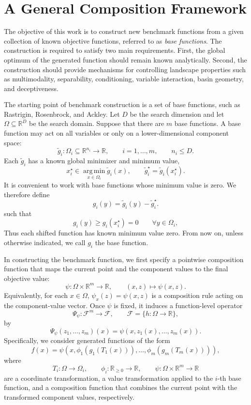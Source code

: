 \documentclass[11pt,a4paper]{article}
\theoremstyle{remark}
\theoremstyle{plain}
\begin{document}
\section{A General Composition Framework}
\label{sec:general-composition}

The objective of this work is to construct new benchmark functions from a
given collection of known objective functions, referred to as
\emph{base functions}. The construction is required to satisfy two main
requirements. First, the global optimum of the generated function should remain
known analytically. Second, the construction should provide mechanisms for
controlling landscape properties such as multimodality, separability,
conditioning, variable interaction, basin geometry, and deceptiveness.

The starting point of benchmark construction is a set of base functions, such
as Rastrigin, Rosenbrock, and Ackley. Let \(D\) be the search dimension and let
\(\Omega\subseteq\mathbb{R}^D\) be the search domain. Suppose that there are
\(m\) base functions. A base function may act on all variables or only on a
lower-dimensional component space:
\[
\tilde g_i:\Omega_i\subseteq\mathbb{R}^{n_i}\to\mathbb{R},
\qquad i=1,\ldots,m,
\qquad n_i\le D.
\]
Each \(\tilde g_i\) has a known global minimizer and minimum value,
\[
x_i^\star\in\operatorname*{arg\,min}_{x\in\Omega_i}\tilde g_i(x),\qquad 
\tilde g_i^\star
=
\tilde g_i(x_i^\star).
\]
It is convenient to work with base functions whose minimum value is zero. We
therefore define
\[
g_i(y)
=
\tilde g_i(y)-\tilde g_i^\star.
\label{eq:bias-corrected-base}
\]
such that
\[
g_i(y)\ge g_i(x_i^\star) =0
\qquad\forall y\in\Omega_i,
\]
Thus each shifted function has known minimum value zero. From now on, unless
otherwise indicated, we call \(g_i\) the base function.

In constructing the benchmark function, we first specify a pointwise composition
function that maps the current point and the component values to the final
objective value:
\[
	\psi:\Omega\times\mathbb{R}^m\to\mathbb{R},
	\qquad
	(x,z)\mapsto \psi(x,z).
\]
Equivalently, for each \(x\in\Omega\), \(\psi_x(z)=\psi(x,z)\) is a
composition rule acting on the component-value vector. Once \(\psi\) is fixed,
it induces a function-level operator
\[
	\Psi_\psi:\mathcal{F}^m\to\mathcal{F},
	\qquad
	\mathcal{F}=\{h:\Omega\to\mathbb{R}\},
\]
by
\[
	\Psi_\psi(z_1,\ldots,z_m)(x)=\psi(x,z_1(x),\ldots,z_m(x)).
\]
Specifically, we consider generated functions of the form
\begin{equation}
\boxed{
	f(x)
	=
	\psi
	\left(
	x,
	\phi_1\!\left(g_1(T_1(x))\right),
	\ldots,
	\phi_m\!\left(g_m(T_m(x))\right)
	\right),
}
\label{eq:general-composition}
\end{equation}
where
\[
T_i:\Omega\to\Omega_i, \qquad
\phi_i:\mathbb{R}_{\ge0}\to\mathbb{R}, \qquad
\psi:\Omega\times\mathbb{R}^m\to\mathbb{R}
\]
are a coordinate transformation, a value transformation applied to the \(i\)-th
base function, and a composition function that combines the current point with
the transformed component values, respectively.
\end{document}
